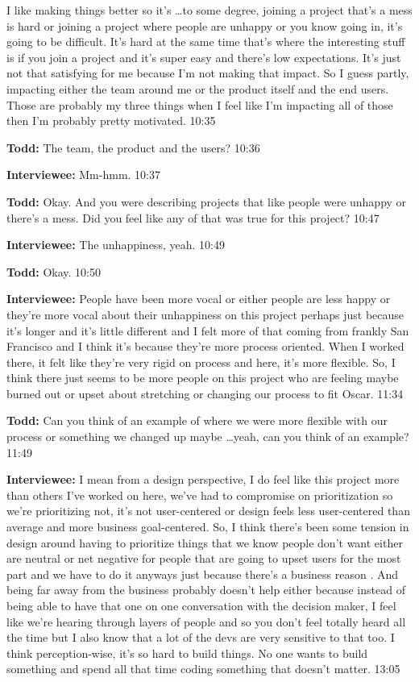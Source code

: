 I like making things better so it's \ldots to some degree, joining a project that's a mess is hard or joining a project where people are unhappy or you know going in, it's going to be difficult.  It's hard at the same time that's where the interesting stuff is if you join a project and it's super easy and there's low expectations.  It's just not that satisfying for me because I'm not making that impact.  So I guess partly, impacting either the team around me or the product itself and the end users.  Those are probably my three things when I feel like I'm impacting all of those then I'm probably pretty motivated.  10:35

\textbf{Todd:} The team, the product and the users?  10:36

\textbf{Interviewee:} Mm-hmm.  10:37

\textbf{Todd:} Okay.  And you were describing projects that like people were unhappy or there's a mess.  Did you feel like any of that was true for this project?  10:47

\textbf{Interviewee:} The unhappiness, yeah.  10:49

\textbf{Todd:} Okay.  10:50

\textbf{Interviewee:} People have been more vocal or either people are less happy or they're more vocal about their unhappiness on this project perhaps just because it's longer and it's little different and I felt more of that coming from frankly San Francisco and I think it's because they're more process oriented.  When I worked there, it felt like they're very rigid on process and here, it's more flexible.  So, I think there just seems to be more people on this project who are feeling maybe burned out or upset about stretching or changing our process to fit Oscar.  11:34

\textbf{Todd:} Can you think of an example of where we were more flexible with our process or something we changed up maybe \ldots yeah, can you think of an example?  11:49

\textbf{Interviewee:} I mean from a design perspective, I do feel like this project more than others I've worked on here, we've had to compromise on prioritization so we're prioritizing not, it's not user-centered or design feels less user-centered than average and more business goal-centered.  So, I think there's been some tension in design around having to prioritize things that we know people don't want either are neutral or net negative for people that are going to upset users for the most part and we have to do it anyways just because there's a business reason .  And being far away from the business probably doesn't help either because instead of being able to have that one on one conversation with the decision maker, I feel like we're hearing through layers of people and so you don't feel totally heard all the time but I also know that a lot of the devs are very sensitive to that too.  I think perception-wise, it's so hard to build things.  No one wants to build something and spend all that time coding something that doesn't matter.  13:05

